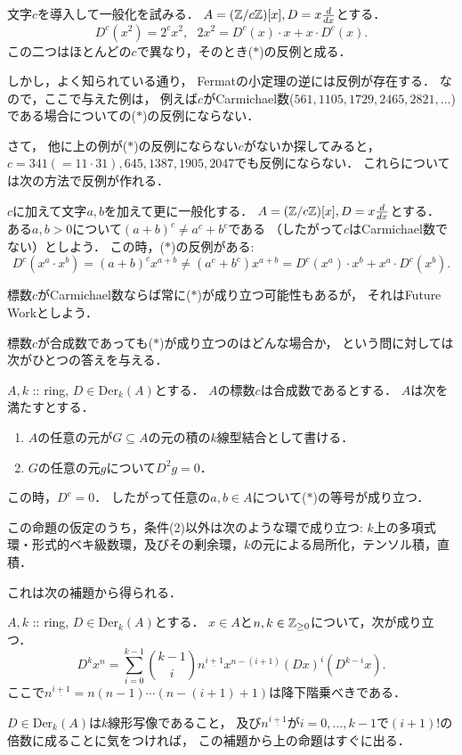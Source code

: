 \documentclass[a4paper]{jsarticle}
\newcommand{\Der}{\mathrm{Der}}
\begin{document}
\begin{Example}
    文字$c$を導入して一般化を試みる．
    $A=(\mathbb{Z}/c\mathbb{Z})[x], D=x \frac{d}{dx}$とする．
    \[ D^c(x^2)=2^c x^2,~~~ 2x^2=D^c(x) \cdot x+x \cdot D^c(x). \]
    この二つはほとんどの$c$で異なり，そのとき($*$)の反例と成る．
\end{Example}

    しかし，よく知られている通り，
    Fermatの小定理の逆には反例が存在する．
    なので，ここで与えた例は，
    例えば$c$がCarmichael数($561, 1105, 1729, 2465, 2821, \dots$)
    である場合についての($*$)の反例にならない．

    さて，
    他に上の例が($*$)の反例にならない$c$がないか探してみると，
    $c=341(=11 \cdot 31), 645, 1387, 1905, 2047$でも反例にならない．
    これらについては次の方法で反例が作れる．
\begin{Example}
    $c$に加えて文字$a,b$を加えて更に一般化する．
    $A=(\mathbb{Z}/c\mathbb{Z})[x], D=x \frac{d}{dx}$とする．
    ある$a,b>0$について$(a+b)^c \neq a^c+b^c$である
    （したがって$c$はCarmichael数でない）としよう．
    この時，($*$)の反例がある:
    \[ D^c(x^a \cdot x^b)=(a+b)^c x^{a+b} \neq (a^c+b^c)x^{a+b}=D^c(x^a) \cdot x^b+x^a \cdot D^c(x^b). \]
\end{Example}

標数$c$がCarmichael数ならば常に($*$)が成り立つ可能性もあるが，
それはFuture Workとしよう．

標数$c$が合成数であっても($*$)が成り立つのはどんな場合か，
という問に対しては次がひとつの答えを与える．
\begin{Prop}
    $A, k$ :: ring, $D \in \Der_k(A)$とする．
    $A$の標数$c$は合成数であるとする．
    $A$は次を満たすとする．
    \begin{enumerate}[label=(\arabic*)]
        \item $A$の任意の元が$G \subseteq A$の元の積の$k$線型結合として書ける．
        \item $G$の任意の元$g$について$D^2g=0$．
    \end{enumerate}
    この時，$D^c=0$．
    したがって任意の$a,b \in A$について($*$)の等号が成り立つ．
\end{Prop}
この命題の仮定のうち，条件(2)以外は次のような環で成り立つ:
$k$上の多項式環・形式的ベキ級数環，及びその剰余環，$k$の元による局所化，テンソル積，直積．

これは次の補題から得られる．
\begin{Lemma}
    $A, k$ :: ring, $D \in \Der_k(A)$とする．
    $x \in A$と$n,k \in \mathbb{Z}_{\geq 0}$について，次が成り立つ．
    \[ D^k x^n=\sum_{i=0}^{k-1} \binom{k-1}{i} n^{\underline{i+1}} x^{n-(i+1)} (Dx)^i (D^{k-i} x). \]
    ここで$n^{\underline{i+1}}=n(n-1)\cdots(n-(i+1)+1)$は降下階乗べきである．
\end{Lemma}
$D \in \Der_k(A)$は$k$線形写像であること，
及び$n^{\underline{i+1}}$が$i=0,\dots,k-1$で$(i+1)!$の倍数に成ることに気をつければ，
この補題から上の命題はすぐに出る．
\end{document}
